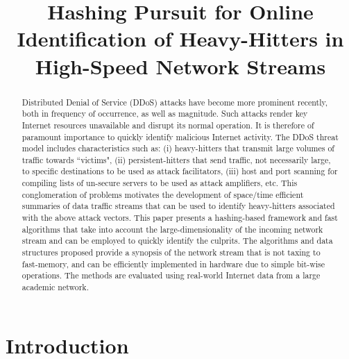 \documentclass[10pt, conference, letterpaper,onecolumn]{IEEEtranv1.8}
\theoremstyle{plain}\newtheorem{thm}{Theorem}\newtheorem{lem}{Lemma}
\theoremstyle{definition}
\begin{document}
\title{Hashing Pursuit for Online Identification of Heavy-Hitters in High-Speed Network Streams}


\author{
 }

\maketitle

\begin{abstract}
Distributed Denial of Service (DDoS) attacks have become more prominent recently, both in frequency of occurrence, as well as magnitude. Such attacks render key Internet resources unavailable and disrupt its normal operation. It is therefore of paramount importance to quickly identify malicious Internet activity. The DDoS threat model includes characteristics such as: (i) heavy-hitters that transmit large volumes of traffic towards ``victims", (ii) persistent-hitters that send traffic, not necessarily large, to specific destinations to be used as attack facilitators, (iii) host and port scanning for compiling lists of un-secure servers to be used as attack amplifiers, etc. This conglomeration of problems motivates the development of space/time efficient summaries of data traffic streams that can be used to identify heavy-hitters associated with the above attack vectors. This paper presents a hashing-based framework and fast algorithms that take into account the large-dimensionality of the incoming network stream and can be employed to quickly identify the culprits. The algorithms and data structures proposed provide a synopsis of the network stream that is not taxing to fast-memory, and can be efficiently implemented in hardware due to simple bit-wise operations. The methods are evaluated using real-world Internet data from a large academic network.
\end{abstract}


\section{Introduction}
\end{document}
